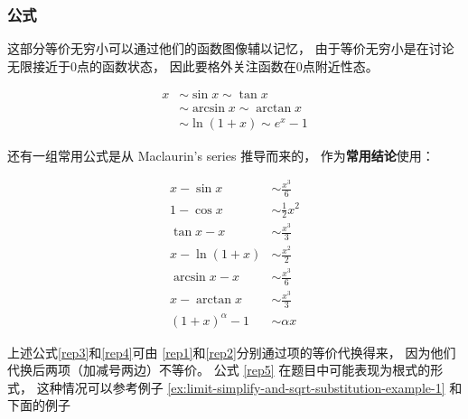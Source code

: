\subsubsection{公式}
这部分等价无穷小可以通过他们的函数图像辅以记忆，
由于等价无穷小是在讨论无限接近于0点的函数状态，
因此要格外关注函数在0点附近性态。

\begin{lemma}[等价无穷小]
	\begin{align}
		x&\sim\sin{x}\sim\tan{x} \\ 
		&\sim\arcsin{x}\sim\arctan{x} \\
		&\sim\ln{(1+x)}\sim e^x-1
	\end{align}
\end{lemma}

还有一组常用公式是从 Maclaurin's series 推导而来的，
作为\textbf{常用结论}使用：
\begin{lemma}[等价无穷小]
	\begin{align}
		x - \sin{x}     &\sim \frac{x^3}{6} \label{rep1} \\
        1 - \cos{x}     &\sim \frac{1}{2} x^2 \\
		\tan{x} - x     &\sim \frac{x^3}{3} \label{rep2} \\
		x - \ln{(1+x)}  &\sim \frac{x^2}{2} \\
		\arcsin{x} - x  &\sim \frac{x^3}{6} \label{rep3}\\
		x - \arctan{x}  &\sim \frac{x^3}{3} \label{rep4}\\
        (1+x)^\alpha-1  &\sim \alpha x \label{rep5}
	\end{align}
\end{lemma}
上述公式\eqref{rep3}和\eqref{rep4}可由
\eqref{rep1}和\eqref{rep2}分别通过项的等价代换得来，
因为他们代换后两项（加减号两边）不等价。
公式 \ref{rep5} 在题目中可能表现为根式的形式，
这种情况可以参考例子
\ref{ex:limit-simplify-and-sqrt-substitution-example-1}
和下面的例子

